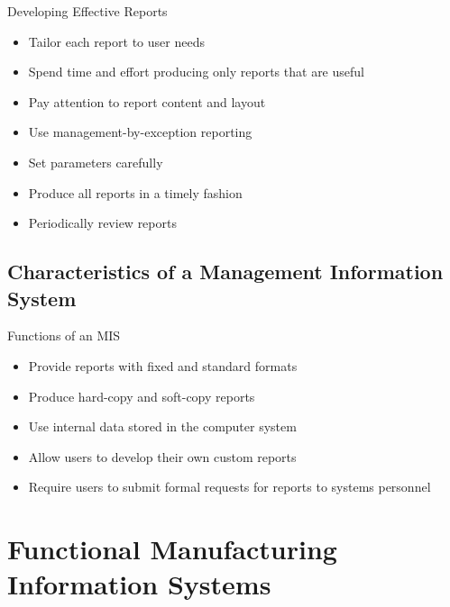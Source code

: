 \documentclass[\main/notes.tex]{subfiles}
\begin{document}
				\begin{sidenote}{Developing Effective Reports}
					\begin{multicols}{2}
						\begin{itemize}[nosep]
							\item Tailor each report to user needs
							\item Spend time and effort producing only reports that are useful
							\item Pay attention to report content and layout
							\item Use management-by-exception reporting
							\item Set parameters carefully
							\item Produce all reports in a timely fashion
							\item Periodically review reports
						\end{itemize}
					\end{multicols}
				\end{sidenote}
			\subsection{Characteristics of a Management Information System}
				\begin{sidenote}{Functions of an MIS}
					\begin{multicols}{2}
						\begin{itemize}[nosep]
							\item Provide reports with fixed and standard formats
							\item Produce hard-copy and soft-copy reports
							\item Use internal data stored in the computer system
							\item Allow users to develop their own custom reports
							\item Require users to submit formal requests for reports to systems personnel
						\end{itemize}
					\end{multicols}
				\end{sidenote}

		\section{Functional Manufacturing Information Systems}
\end{document}
